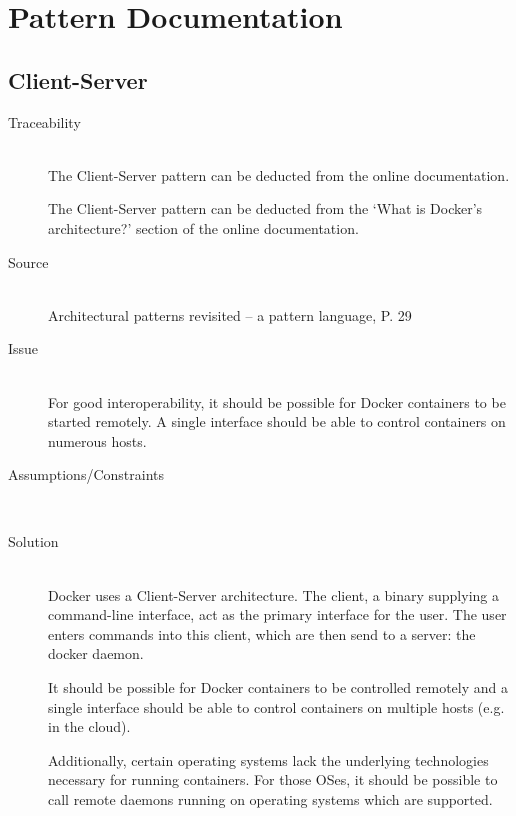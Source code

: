 
\clearpage
\chapter{Pattern Documentation}
\label{ch:patterns}

\section{Client-Server}


\begin{description}
\item [Traceability]~\\
The Client-Server pattern can be deducted from the online documentation\cite{dockerarchi}.

The Client-Server pattern can be deducted from the `What is Docker’s architecture?' section of the online documentation\cite{dockerarchi}.

\item [Source]~\\
Architectural patterns revisited -- a pattern language, P. 29 \cite{avgeriou2005architectural}

\item [Issue]~\\
For good interoperability, it should be possible for Docker containers to be started remotely. A single interface should be able to control containers on numerous hosts.

\item [Assumptions/Constraints]~

\item [Solution]~\\
Docker uses a Client-Server architecture. The client, a binary supplying a command-line interface, act as the primary interface for the user. The user enters commands into this client, which are then send to a server: the docker daemon. 


It should be possible for Docker containers to be controlled remotely and a single interface should be able to control containers on multiple hosts (e.g. in the cloud).

Additionally, certain operating systems lack the underlying technologies necessary for running containers. For those OSes, it should be possible to call remote daemons running on operating systems which are supported. %


\end{description}
